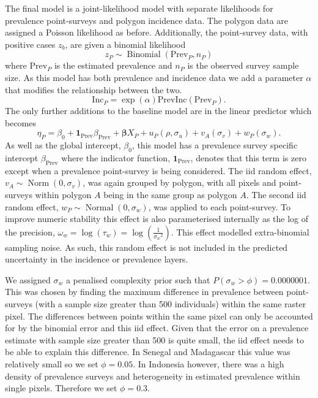\documentclass{statsoc}
\begin{document}
The final model is a joint-likelihood model with separate likelihoods for prevalence point-surveys and polygon incidence data.
The polygon data are assigned a Poisson likelihood as before.
Additionally, the point-survey data, with positive cases $z_b$, are given a binomial likelihood
$$z_P \sim \operatorname{Binomial}(\mathrm{Prev}_P, n_P) $$
where $\mathrm{Prev}_P$ is the estimated prevalence and $n_P$ is the observed survey sample size. 
As this model has both prevalence and incidence data we add a parameter $\alpha$ that modifies the relationship between the two.
$$\mathrm{Inc}_P = \exp(\alpha)\mathrm{PrevInc}(\mathrm{Prev}_P).$$
The only further additions to the baseline model are in the linear predictor which becomes 
$$\eta_P = \beta_0 + \mathbf{1}_\mathrm{Prev}\beta_\mathrm{Prev} +  \boldsymbol\beta X_P  + u_P(\rho, \sigma_u) + v_A(\sigma_v) + w_P(\sigma_w).$$
As well as the global intercept, $\beta_0$, this model has a prevalence survey specific intercept $\beta_\mathrm{Prev}$ where the indicator function, $\mathbf{1}_\mathrm{Prev}$, denotes that this term is zero except when a prevalence point-survey is being considered.
The iid random effect, $v_A \sim \operatorname{Norm}(0, \sigma_v)$, was again grouped by polygon, with all pixels and point-surveys within polygon $A$ being in the same group as polygon $A$.
The second iid random effect, $w_P \sim \operatorname{Normal}(0, \sigma_w)$, was applied to each point-survey.
To improve numeric stability this effect is also parameterised internally as the log of the precision, $\omega_w = \log(\tau_w) = \log(\frac{1}{{\sigma_w}^2})$.
This effect modelled extra-binomial sampling noise.
As such, this random effect is not included in the predicted uncertainty in the incidence or prevalence layers.


We assigned $\sigma_w$ a penalised complexity prior such that $P(\sigma_w > \phi) = 0.0000001$. 
This was chosen by finding the maximum difference in prevalence between point-surveys (with a sample size greater than 500 individuals) within the same raster pixel.
The differences between points within the same pixel can only be accounted for by the binomial error and this iid effect.
Given that the error on a prevalence estimate with sample size greater than 500 is quite small, the iid effect needs to be able to explain this difference.
In Senegal and Madagascar this value was relatively small so we set $\phi = 0.05$. 
In Indonesia however, there was a high density of prevalence surveys and heterogeneity in estimated prevalence within single pixels.
Therefore we set $\phi = 0.3$.
\end{document}
